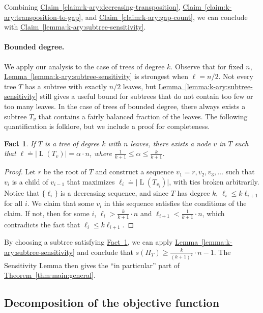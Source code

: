 \documentclass[11pt]{article}
\numberwithin{equation}{section}
\newtheorem{fact}[theorem]{Fact}
\theoremstyle{definition}
\theoremstyle{plain}
\newcommand{\expref}[2]{\hyperref[#2]{#1~\ref{#2}}}
\DeclareMathOperator{\leafset}{L}
\begin{document}
Combining \expref{Claim}{claim:k-ary:decreasing-transposition}, \expref{Claim}{claim:k-ary:transposition-to-gap}, and \expref{Claim}{claim:k-ary:gap-count}, we can conclude with \expref{Claim}{lemma:k-ary:subtree-sensitivity}.

\paragraph{Bounded degree.}
We apply our analysis to the case of trees of degree $k$. Observe that for fixed $n$, \expref{Lemma}{lemma:k-ary:subtree-sensitivity} is strongest when $\ell=n/2$. Not every tree $T$ has a subtree with exactly $n/2$ leaves, but \expref{Lemma}{lemma:k-ary:subtree-sensitivity} still gives a useful bound for subtrees that do not contain too few or too many leaves. In the case of trees of bounded degree, there always exists a subtree $T_v$ that contains a fairly balanced fraction of the leaves. The following quantification is folklore, but we include a proof for completeness.
 
\begin{fact}
    \label{fact:k-ary:balance}
    If $T$ is a tree of degree $k$ with $n$ leaves, there exists a node $v$ in $T$ such that $\ell \doteq \lvert\leafset(T_v)\rvert = \alpha 
    \cdot n$, where $\frac{1}{k+1} \le \alpha \le \frac{k}{k+1}$.
\end{fact}

\begin{proof}
    Let $r$ be the root of $T$ and construct a sequence $v_1=r,v_2,v_3,\dots$ such that $v_{i}$ is a child of $v_{i-1}$ that maximizes $\ell_{i} \doteq \lvert\leafset(T_{v_{i}})\rvert$, with ties broken arbitrarily. Notice that $\{\ell_i\}$ is a decreasing sequence, and since $T$ has degree $k$, $\ell_{i} \le k\ell_{i+1}$ for all $i$. We claim that some $v_i$ in this sequence satisfies the conditions of the claim. If not, then for some $i$, $\ell_i> \frac{k}{k+1}\cdot n$ and $\ell_{i+1}< \frac{1}{k+1}\cdot n$, which contradicts the fact that $\ell_i\le k\ell_{i+1}$.
\end{proof}

By choosing a subtree satisfying \expref{Fact}{fact:k-ary:balance}, we can apply \expref{Lemma}{lemma:k-ary:subtree-sensitivity} and conclude that $s(\Pi_T)\ge \frac{k}{(k+1)^2} \cdot n -1$. The Sensitivity Lemma then gives the ``in particular'' part of \expref{Theorem}{thm:main:general}.

\subsection{Decomposition of the objective function}
\label{sec:decomposition}
\end{document}
